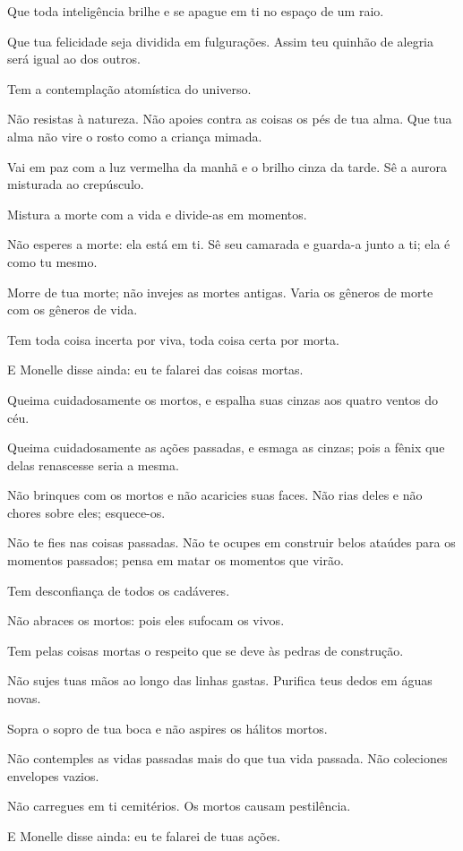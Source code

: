 Que toda inteligência brilhe e se apague em ti no espaço de um raio.

Que tua felicidade seja dividida em fulgurações. Assim teu quinhão de
alegria será igual ao dos outros.

Tem a contemplação atomística do universo.

Não resistas à natureza. Não apoies contra as coisas os pés de tua
alma. Que tua alma não vire o rosto como a criança mimada.

Vai em paz com a luz vermelha da manhã e o brilho cinza da tarde. Sê a
aurora misturada ao crepúsculo.

Mistura a morte com a vida e divide-as em momentos.

Não esperes a morte: ela está em ti. Sê seu camarada e guarda-a junto a
ti; ela é como tu mesmo.

Morre de tua morte; não invejes as mortes antigas. Varia os gêneros de
morte com os gêneros de vida.

Tem toda coisa incerta por viva, toda coisa certa por morta.

E Monelle disse ainda: eu te falarei das coisas \mbox{mortas.}

Queima cuidadosamente os mortos, e espalha suas cinzas aos quatro
ventos do céu.

Queima cuidadosamente as ações passadas, e esmaga as cinzas; pois a
fênix que delas renascesse seria a mesma.

Não brinques com os mortos e não acaricies suas faces. Não rias deles e
não chores sobre eles; esquece-os.

Não te fies nas coisas passadas. Não te ocupes em construir belos
ataúdes para os momentos passados; pensa em matar os momentos que virão.

Tem desconfiança de todos os cadáveres.

Não abraces os mortos: pois eles sufocam os vivos.

Tem pelas coisas mortas o respeito que se deve às pedras de construção.

Não sujes tuas mãos ao longo das linhas gastas. Purifica teus dedos em
águas novas.

Sopra o sopro de tua boca e não aspires os hálitos mortos.

Não contemples as vidas passadas mais do que tua vida passada. Não
coleciones envelopes vazios.

Não carregues em ti cemitérios. Os mortos causam pestilência.

E Monelle disse ainda: eu te falarei de tuas ações.


